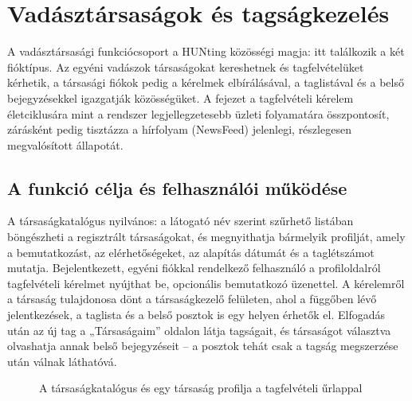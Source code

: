 
\chapter{Vadásztársaságok és tagságkezelés}
\label{chap:tarsasagok}

A vadásztársasági funkciócsoport a HUNting közösségi magja: itt találkozik a két fióktípus. Az
egyéni vadászok társaságokat kereshetnek és tagfelvételüket kérhetik, a társasági fiókok pedig a
kérelmek elbírálásával, a taglistával és a belső bejegyzésekkel igazgatják közösségüket. A fejezet
a tagfelvételi kérelem életciklusára mint a rendszer legjellegzetesebb üzleti folyamatára
összpontosít, zárásként pedig tisztázza a hírfolyam (NewsFeed) jelenlegi, részlegesen megvalósított
állapotát.

\section{A funkció célja és felhasználói működése}
\label{sec:soc-cel}

A társaságkatalógus nyilvános: a látogató név szerint szűrhető listában böngészheti a regisztrált
társaságokat, és megnyithatja bármelyik profilját, amely a bemutatkozást, az elérhetőségeket, az
alapítás dátumát és a taglétszámot mutatja. Bejelentkezett, egyéni fiókkal rendelkező felhasználó a
profiloldalról tagfelvételi kérelmet nyújthat be, opcionális bemutatkozó üzenettel. A kérelemről a
társaság tulajdonosa dönt a társaságkezelő felületen, ahol a függőben lévő jelentkezések, a
taglista és a belső posztok is egy helyen érhetők el. Elfogadás után az új tag a „Társaságaim”
oldalon látja tagságait, és társaságot választva olvashatja annak belső bejegyzéseit -- a posztok
tehát csak a tagság megszerzése után válnak láthatóvá.

\begin{figure}[htbp]
	\centering
	\caption{A társaságkatalógus és egy társaság profilja a tagfelvételi űrlappal}
	\label{fig:societies-screens}
\end{figure}

